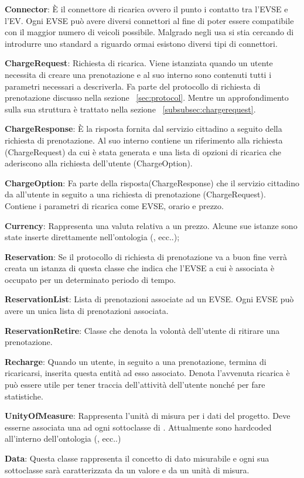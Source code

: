 \begin{description}
	\item \textbf{Connector}: È il connettore di ricarica ovvero il punto i contatto tra l'EVSE e l'EV. Ogni EVSE può avere diversi connettori al fine di poter essere compatibile con il maggior numero di veicoli possibile. Malgrado negli usa si stia cercando di introdurre uno standard a riguardo ormai esistono diversi tipi di connettori. 
	\item \textbf{ChargeRequest}: Richiesta di ricarica. Viene istanziata quando un utente necessita di creare una prenotazione e al suo interno sono contenuti tutti i parametri necessari a descriverla. Fa parte del protocollo di richiesta di prenotazione discusso nella sezione ~\ref{sec:protocol}. Mentre un approfondimento sulla sua struttura è trattato nella sezione ~\ref{subsubsec:chargerequest}.
	\item \textbf{ChargeResponse}: È la risposta fornita dal servizio cittadino a seguito della richiesta di prenotazione. Al suo interno contiene un riferimento alla richiesta (ChargeRequest) da cui è stata generata e una lista di opzioni di ricarica che aderiscono alla richiesta dell'utente (ChargeOption).
	\item \textbf{ChargeOption}: Fa parte della risposta(ChargeResponse) che il servizio cittadino da all'utente in seguito a una richiesta di prenotazione (ChargeRequest). Contiene i parametri di ricarica come EVSE, orario e prezzo. 
	\item \textbf{Currency}: Rappresenta una valuta relativa a un prezzo. Alcune sue istanze sono state inserte direttamente nell'ontologia (,  ecc..);
	\item \textbf{Reservation}: Se il protocollo di richiesta di prenotazione va a buon fine verrà creata un istanza di questa classe che indica che l'EVSE a cui è associata è occupato per un determinato periodo di tempo. 
	\item \textbf{ReservationList}: Lista di prenotazioni associate ad un EVSE. Ogni EVSE può avere un unica lista di prenotazioni associata.
	\item \textbf{ReservationRetire}: Classe che denota la volontà dell'utente di ritirare una prenotazione.
	\item \textbf{Recharge}: Quando un utente, in seguito a una prenotazione, termina di ricaricarsi, inserita questa entità ad esso associato. Denota l'avvenuta ricarica è può essere utile per tener traccia dell'attività dell'utente nonché per fare statistiche.
	\item \textbf{UnityOfMeasure}: Rappresenta l'unità di misura per i dati del progetto. Deve esserne associata una ad ogni sottoclasse di . Attualmente sono hardcoded all'interno dell'ontologia (,  ecc..) 	
	\item \textbf{Data}: Questa classe rappresenta il concetto di dato misurabile e ogni sua sottoclasse sarà caratterizzata da un valore e da un unità di misura.
\end{description}

